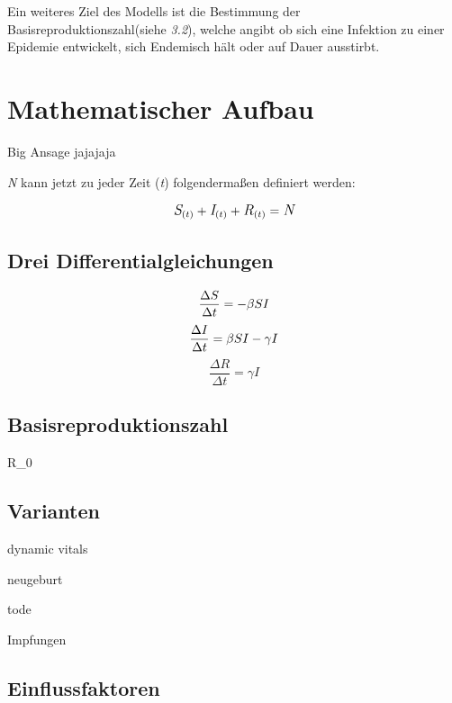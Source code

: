 \documentclass[12pt]{scrartcl} %
\begin{document}
Ein weiteres Ziel des Modells ist die Bestimmung der Basisreproduktionszahl(siehe \textsl{3.2}), welche angibt ob sich eine Infektion zu einer Epidemie entwickelt, sich Endemisch hält oder auf Dauer ausstirbt. \cite[vgl.]{2}

\newpage
\section{Mathematischer Aufbau}

Big Ansage jajajaja

\textit{N} kann jetzt zu jeder Zeit (\textit{t}) folgendermaßen definiert werden: \cite{3}


$$ \large\textit{S}_{(t)} + \textit{I}_{(t)} + \textit{R}_{(t)} = \textit{N}\normalsize $$


\subsection{Drei Differentialgleichungen}

$$ \frac{\Delta S}{\Delta t} = -\beta\space S I $$
$$ \frac{\Delta I}{\Delta t} = \beta\space S I - \gamma I $$
$$ \frac{\Delta R}{\Delta t} = \gamma I $$


\subsection{Basisreproduktionszahl}

R_{0}


\subsection{Varianten}

dynamic vitals

\textnu neugeburt

\textmu tode

\textrho Impfungen


\subsection{Einflussfaktoren}
\end{document}
